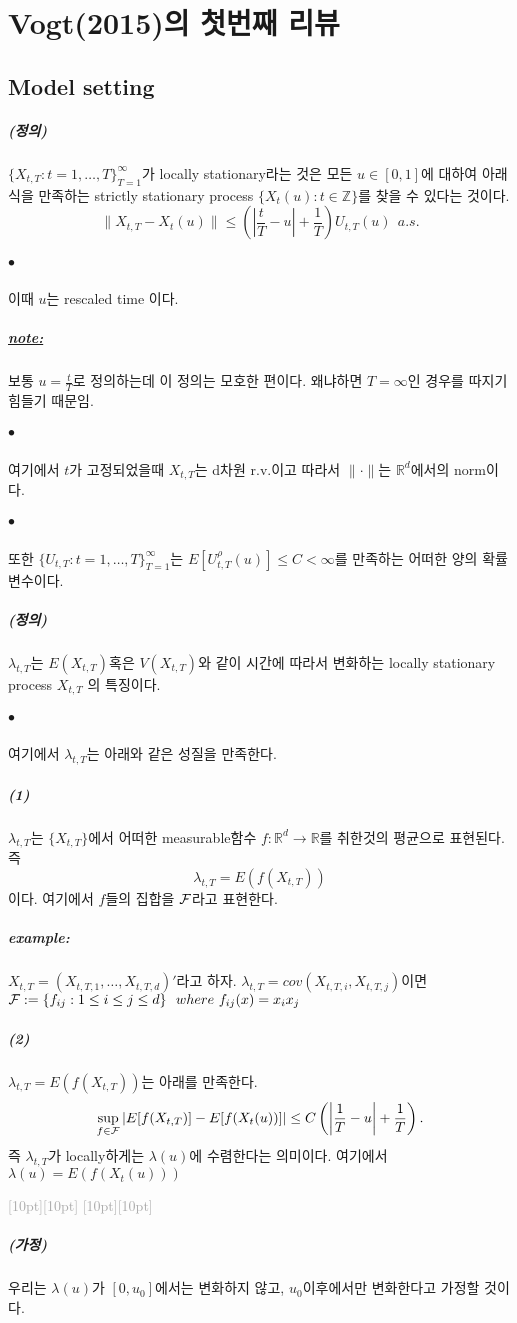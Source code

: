 \documentclass[12pt,oneside,english]{book}
\newcommand{\rdash}{\noindent \textcolor{darkgray}{ \raisebox{-1.9pt}[10pt][10pt]{\leafright} \hrulefill \raisebox{-1.9pt}[10pt][10pt]{\leafright \decofourleft \decothreeleft  \aldineright \decotwo \floweroneleft \decoone}}}
\def\ck{\paragraph{\LARGE$\bullet$}\LARGE}
\def\assume{\paragraph{\LARGE(가정)}\LARGE}
\def\dfn{\paragraph{\LARGE(정의)}\LARGE}
\def\note{\paragraph{\LARGE\textit{\underline{note:}}}\LARGE}
\def\ex{\paragraph{\LARGE\textit{example:}}\LARGE}
\def\one{\paragraph{\LARGE(1)}\LARGE}
\def\two{\paragraph{\LARGE(2)}\LARGE}
\begin{document}


\chapter{Vogt(2015)의 첫번째 리뷰}
\section{Model setting}
\dfn 
$\{X_{t,T}:t=1,\dots,T\}_{T=1}^{\infty}$가 locally stationary라는 것은 모든 $u \in [0,1]$에 대하여 아래식을 만족하는 strictly stationary process $\{X_t(u):t \in \mathbb{Z}\}$를 찾을 수 있다는 것이다.
\[
\|X_{t,T}-X_t(u)\|\leq \left(\left| \frac{t}{T}-u \right|+\frac{1}{T} \right)U_{t,T}(u)~~a.s.
\]

\ck 이때 $u$는 rescaled time 이다. 

\note 보통 $u=\frac{t}{T}$로 정의하는데 이 정의는 모호한 편이다. 왜냐하면 $T=\infty$인 경우를 따지기 힘들기 때문임.

\ck 여기에서 $t$가 고정되었을때 $X_{t,T}$는 d차원 r.v.이고 따라서 $\| \cdot \|$는 $\mathbb{R}^d$에서의 norm이다. 

\ck 또한 $\{U_{t,T}:t=1,\dots,T\}_{T=1}^{\infty}$는 $E[U_{t,T}^{\rho}(u)] \leq C < \infty$를 만족하는 어떠한 양의 확률변수이다. 

\dfn 
$\lambda_{t,T}$는 $E(X_{t,T})$혹은 $V(X_{t,T})$와 같이 시간에 따라서 변화하는 locally stationary process $X_{t,T}$ 의 특징이다. 

\ck 여기에서 $\lambda_{t,T}$는 아래와 같은 성질을 만족한다. 

\one $\lambda_{t,T}$는 $\{X_{t,T}\}$에서 어떠한 measurable함수 $f:\mathbb{R}^d \rightarrow \mathbb{R}$를 취한것의 평균으로 표현된다. 즉 $$\lambda_{t,T}=E(f(X_{t,T}))$$이다. 여기에서 $f$들의 집합을 $\cal F$라고 표현한다. 	

\ex $X_{t,T}=(X_{t,T,1},\dots,X_{t,T,d})'$라고 하자. $\lambda_{t,T}=cov(X_{t,T,i},X_{t,T,j})$이면 ${\cal F}:=\{f_{ij}:1\leq i \leq j \leq d\} ~~ where~f_{ij}(x)=x_ix_j$

\two $\lambda_{t,T}=E(f(X_{t,T}))$는 아래를 만족한다. $$\sup_{f\in {\cal F}} \left|E[f(X_{t,T})]-E[f(X_t(u))]\right| \leq C \left(\left| \frac{1}{T}-u \right|+\frac{1}{T} \right).$$ 즉 $\lambda_{t,T}$가 locally하게는 $\lambda(u)$에 수렴한다는 의미이다. 여기에서 $\lambda(u)=E(f(X_t(u)))$

\rdash

\assume 우리는 $\lambda(u)$가 $[0,u_0]$에서는 변화하지 않고, $u_0$이후에서만 변화한다고 가정할 것이다. 
\end{document}
